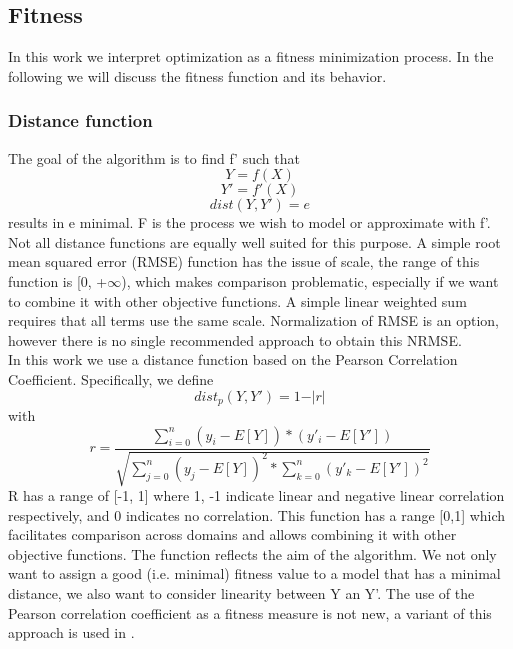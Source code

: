 \subsection{Fitness}
In this work we interpret optimization as a fitness minimization process. In the following we will discuss the fitness function and its behavior.
\subsubsection{Distance function}
The goal of the algorithm is to find f' such that
\[Y = f(X)\]
\[Y' = f'(X)\]
\[dist(Y, Y') = e\]
results in e minimal. F is the process we wish to model or approximate with f'.\\
Not all distance functions are equally well suited for this purpose. A simple root mean squared error (RMSE) function has the issue of scale, the range of this function is [0, +$\infty$), which makes comparison problematic, especially if we want to combine it with other objective functions. A simple linear weighted sum requires that all terms use the same scale. 
Normalization of RMSE is an option, however there is no single recommended approach to obtain this NRMSE. \\
In this work we use a distance function based on the Pearson Correlation Coefficient. Specifically, we define 
\[
dist_p(Y, Y') = 1 - \vert r \vert
\]
with
\[
r = \frac{\sum_{i=0}^{n}{(y_i-E[Y])*(y'_i-E[Y'])}}{\sqrt{\sum_{j=0}^{n}{(y_j-E[Y])^2}*\sum_{k=0}^{n}{(y'_k-E[Y'])^2}}}
\]
R has a range of [-1, 1] where 1, -1 indicate linear and negative linear correlation respectively, and 0 indicates no correlation.
This function has a range [0,1] which facilitates comparison across domains and allows combining it with other objective functions.
The function reflects the aim of the algorithm. We not only want to assign a good (i.e. minimal) fitness value to a model that has a minimal distance, we also want to consider linearity between Y an Y'. The use of the Pearson correlation coefficient as a fitness measure is not new, a variant of this approach is used in \citep{pearson}.

